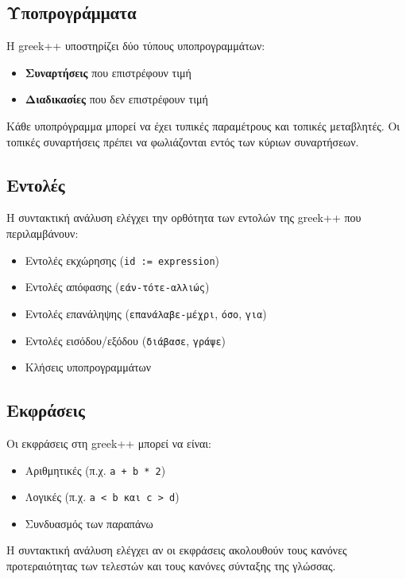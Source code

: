 \documentclass[12pt,a4paper]{article}
\begin{document}
        \subsection{Υποπρογράμματα}
            Η greek++ υποστηρίζει δύο τύπους υποπρογραμμάτων:
            \begin{itemize}
                \item \textbf{Συναρτήσεις} που επιστρέφουν τιμή
                \item \textbf{Διαδικασίες} που δεν επιστρέφουν τιμή
            \end{itemize}

            Κάθε υποπρόγραμμα μπορεί να έχει τυπικές παραμέτρους και τοπικές μεταβλητές. Οι τοπικές συναρτήσεις πρέπει να φωλιάζονται εντός των κύριων συναρτήσεων.

        \subsection{Εντολές}
            Η συντακτική ανάλυση ελέγχει την ορθότητα των εντολών της greek++ που περιλαμβάνουν:
            \begin{itemize}
                \item Εντολές εκχώρησης (\texttt{id := expression})
                \item Εντολές απόφασης (\texttt{εάν-τότε-αλλιώς})
                \item Εντολές επανάληψης (\texttt{επανάλαβε-μέχρι}, \texttt{όσο}, \texttt{για})
                \item Εντολές εισόδου/εξόδου (\texttt{διάβασε}, \texttt{γράψε})
                \item Κλήσεις υποπρογραμμάτων
            \end{itemize}

        \subsection{Εκφράσεις}
            Οι εκφράσεις στη greek++ μπορεί να είναι:
            \begin{itemize}
                \item Αριθμητικές (π.χ. \texttt{a + b * 2})
                \item Λογικές (π.χ. \texttt{a < b και c > d})
                \item Συνδυασμός των παραπάνω
            \end{itemize}

            Η συντακτική ανάλυση ελέγχει αν οι εκφράσεις ακολουθούν τους κανόνες προτεραιότητας των τελεστών και τους κανόνες σύνταξης της γλώσσας.
\end{document}
